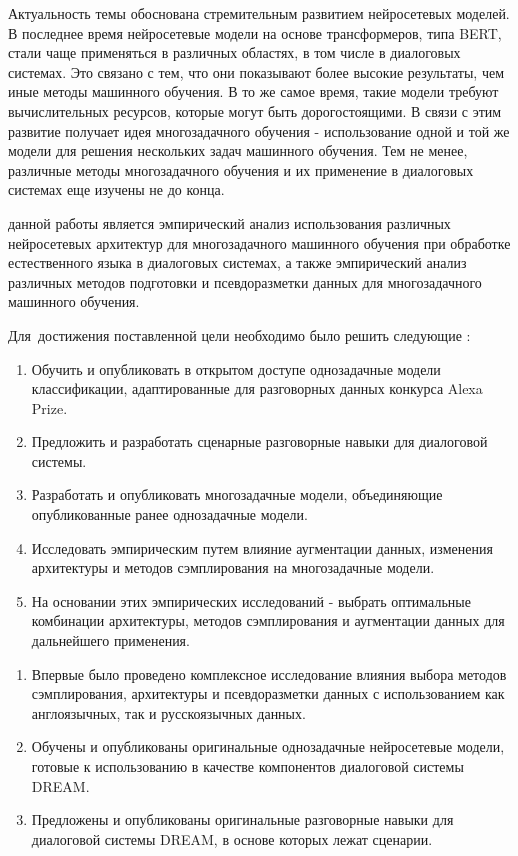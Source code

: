 
{\actuality} 
Актуальность темы обоснована стремительным развитием нейросетевых моделей. В последнее время нейросетевые модели на основе трансформеров, типа BERT, стали чаще применяться в различных областях, в том числе в диалоговых системах. Это связано с тем, что они показывают более высокие результаты, чем иные методы машинного обучения. В то же самое время, такие модели требуют вычислительных ресурсов, которые могут быть дорогостоящими. В связи с этим развитие получает идея многозадачного обучения - использование одной и той же модели для решения нескольких задач машинного обучения. Тем не менее, различные методы многозадачного обучения и их применение в диалоговых системах еще изучены не до конца.


{\aim} данной работы является эмпирический анализ использования различных нейросетевых архитектур для многозадачного машинного обучения при обработке естественного языка в диалоговых системах, а также эмпирический анализ различных методов подготовки и псевдоразметки данных для многозадачного машинного обучения. 

Для~достижения поставленной цели необходимо было решить следующие {\tasks}:
\begin{enumerate}
  \item Обучить и опубликовать в открытом доступе однозадачные модели классификации, адаптированные для разговорных данных конкурса Alexa Prize.
  \item Предложить и разработать сценарные разговорные навыки для
диалоговой системы.
  \item Разработать и опубликовать многозадачные модели, объединяющие опубликованные ранее однозадачные модели.
  \item Исследовать эмпирическим путем влияние аугментации данных, изменения архитектуры и методов сэмплирования на многозадачные модели. 
  \item На основании этих эмпирических исследований - выбрать оптимальные комбинации архитектуры, методов сэмплирования и аугментации данных для дальнейшего применения. \newline
  \newline
  \newline
\end{enumerate}


{\novelty}
\begin{enumerate}
  \item Впервые было проведено комплексное исследование влияния выбора методов сэмплирования, архитектуры и псевдоразметки данных с использованием как англоязычных, так и русскоязычных данных. 
  \item Обучены и опубликованы оригинальные однозадачные нейросетевые модели, готовые к использованию в качестве компонентов диалоговой системы DREAM.
  \item Предложены и опубликованы оригинальные разговорные навыки для диалоговой системы DREAM,
в основе которых лежат сценарии. 
\end{enumerate}


